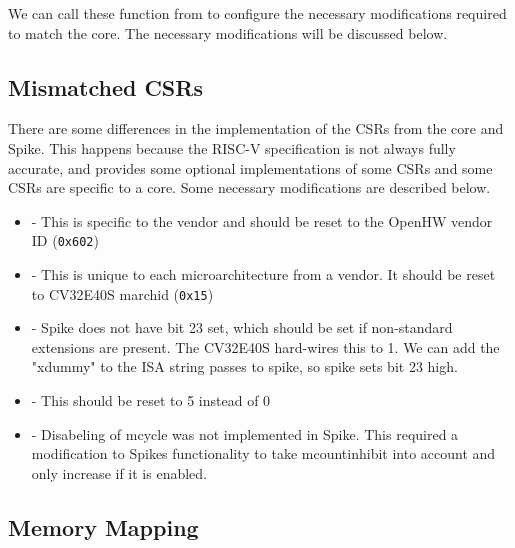 We can call these function from  to configure the necessary modifications required to match the core. The necessary modifications will be discussed below. 

\subsection{Mismatched CSRs}

There are some differences in the implementation of the CSRs from the core and Spike. This happens because the RISC-V specification is not always fully accurate, and provides some optional implementations of some CSRs \cite{watermanRISCVInstructionSet2021} and some CSRs are specific to a core. Some necessary modifications are described below.

\begin{itemize}
    \item {}  - This is specific to the vendor and should be reset to the OpenHW vendor ID (\lstinline{0x602}) 
    \item {} - This is unique to each microarchitecture from a vendor. It should be reset to CV32E40S marchid (\lstinline{0x15})
    \item {} - Spike does not have bit 23 set, which should be set if non-standard extensions are present\cite{watermanRISCVInstructionSet2021}. The CV32E40S hard-wires this to 1. We can add the "xdummy" to the ISA string passes to spike, so spike sets bit 23 high.
    \item {} - This should be reset to 5 instead of 0
    \item {} - Disabeling of mcycle was not implemented in Spike. This required a modification to Spikes functionality to take mcountinhibit into account and only increase  if it is enabled.
\end{itemize}



\subsection{Memory Mapping}

